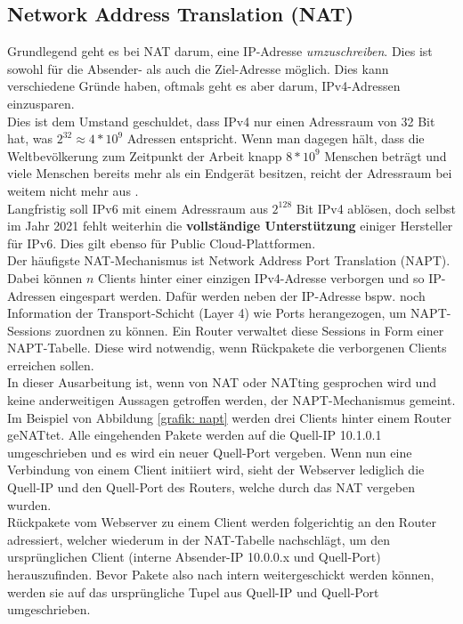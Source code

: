 \subsection{Network Address Translation (NAT)}
Grundlegend geht es bei NAT darum, eine IP-Adresse \textit{umzuschreiben}. Dies ist sowohl für die Absender- als auch die Ziel-Adresse möglich. Dies kann verschiedene Gründe haben, oftmals geht es aber darum, IPv4-Adressen einzusparen.\\
Dies ist dem Umstand geschuldet, dass IPv4 nur einen Adressraum von 32 Bit hat, was $2^{32} \approx 4*10^9$ Adressen entspricht. Wenn man dagegen hält, dass die Weltbevölkerung zum Zeitpunkt der Arbeit knapp $8*10^9$ Menschen beträgt und viele Menschen bereits mehr als ein Endgerät besitzen, reicht der Adressraum bei weitem nicht mehr aus \cite{weltbevoelkerung2020dsw}.\\
Langfristig soll IPv6 mit einem Adressraum aus $2^{128}$ Bit IPv4 ablösen, doch selbst im Jahr 2021 fehlt weiterhin die \textbf{vollständige Unterstützung} einiger Hersteller für IPv6. Dies gilt ebenso für Public Cloud-Plattformen.\\
Der häufigste NAT-Mechanismus ist Network Address Port Translation (NAPT). Dabei können $n$ Clients hinter einer einzigen IPv4-Adresse \glqq verborgen\grqq{} und so IP-Adressen eingespart werden. Dafür werden neben der IP-Adresse bspw. noch Information der Transport-Schicht (Layer 4) wie Ports herangezogen, um NAPT-Sessions zuordnen zu können. Ein Router verwaltet diese Sessions in Form einer NAPT-Tabelle. Diese wird notwendig, wenn Rückpakete die verborgenen Clients erreichen sollen.\\
In dieser Ausarbeitung ist, wenn von NAT oder NATting gesprochen wird und keine anderweitigen Aussagen getroffen werden, der NAPT-Mechanismus gemeint.\\
Im Beispiel von Abbildung \ref{grafik: napt} werden drei Clients hinter einem Router geNATtet. Alle eingehenden Pakete werden auf die Quell-IP 10.1.0.1 umgeschrieben und es wird ein neuer Quell-Port vergeben. Wenn nun eine Verbindung von einem Client initiiert wird, sieht der Webserver lediglich die Quell-IP und den Quell-Port des Routers, welche durch das NAT vergeben wurden.\\
Rückpakete vom Webserver zu einem Client werden folgerichtig an den Router adressiert, welcher wiederum in der NAT-Tabelle nachschlägt, um den ursprünglichen Client (interne Absender-IP 10.0.0.x und Quell-Port) herauszufinden. Bevor Pakete also nach intern weitergeschickt werden können, werden sie auf das ursprüngliche Tupel aus Quell-IP und Quell-Port umgeschrieben.\\

